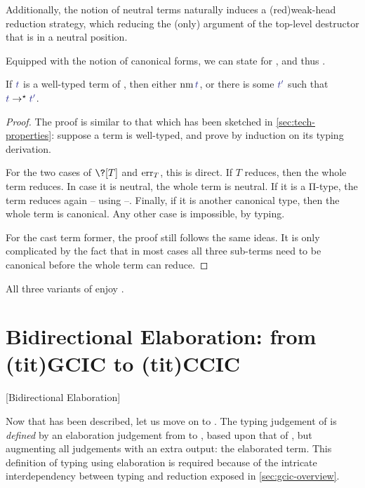 Additionally, the notion of neutral terms naturally induces a \kl(red){weak-head}
reduction strategy, which reducing the (only) argument of the
top-level destructor that is in a neutral position.

Equipped with the notion of canonical forms, we can state  for , and thus
.

\begin{theorem}
  \label{thm:ccic-progress}
  If $\tcol{t}$ is a well-typed term of ,
  then either $\nm \tcol{t}$, or there is some $\tcol{t'}$
  such that $\tcol{t} \red \tcol{t'}$.
\end{theorem}

\begin{proof}
  The proof is similar to that which has been sketched in \cref{sec:tech-properties}:
  suppose a term is well-typed, and prove  by induction on its typing derivation.

  For the two cases of $\?[T]$ and $\err[T]$, this is direct.
  If $T$ reduces, then the whole term reduces.
  In case it is neutral, the whole term is neutral. If it is a Π-type, the term reduces
  again – using \eg {} –. Finally, if it is another canonical type,
  then the whole term is canonical. Any other case is impossible, by typing.

  For the cast term former, the proof still follows the same ideas. It is only complicated
  by the fact that in most cases all three sub-terms need to be canonical before the whole
  term can reduce. 
\end{proof}

\begin{theorem}
  \label{thm:ccic-psafe}
  All three variants of  enjoy .
\end{theorem}

\section{Bidirectional Elaboration: from \kl(tit){GCIC} to \kl(tit){CCIC}}
[Bidirectional Elaboration]
\label{sec:elaboration}

Now that  has been described, let us move on to .
The typing judgement of  is \emph{defined}
by an elaboration judgement from  to , based upon
that of , but
augmenting all judgements with an extra output: the elaborated  term.
This definition of typing using elaboration is required because of the intricate interdependency between typing and reduction exposed in \cref{sec:gcic-overview}.

